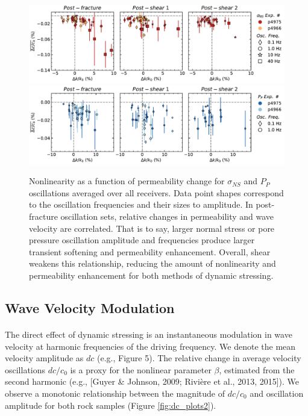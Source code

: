 \documentclass[letterpaper,10pt]{article}
\begin{document}
	
	\begin{figure}[ht]
		\centering
		\includegraphics[width=1\columnwidth]{avgDelc_All_ampsNS}
		\includegraphics[width=1\columnwidth]{avgDelc_All_ampsPP}
		\caption{Nonlinearity as a function of permeability change for $ \sigma_{NS} $ and $ P_P $ oscillations averaged over all receivers. Data point shapes correspond to the oscillation frequencies and their sizes to amplitude. In post-fracture oscillation sets, relative changes in permeability and wave velocity are correlated. That is to say, larger normal stress or pore pressure oscillation amplitude and frequencies produce larger transient softening and permeability enhancement. Overall, shear weakens this relationship, reducing the amount of nonlinearity and permeability enhancement for both methods of dynamic stressing. }
		\label{fig:delc_plots2}
	\end{figure}
	
	\clearpage
	
	\subsection{Wave Velocity Modulation}
	\paragraph{}
	The direct effect of dynamic stressing is an instantaneous modulation in wave velocity at harmonic frequencies of the driving frequency. We denote the mean velocity amplitude as $ dc $ (e.g., Figure 5). The relative change in average velocity oscillations $ dc/c_0 $ is a proxy for the nonlinear parameter $ \beta $, estimated from the second harmonic (e.g., [Guyer \& Johnson, 2009; Rivi\`ere et al., 2013, 2015]). We observe a monotonic relationship between the magnitude of $ dc/c_0 $ and oscillation amplitude for both rock samples (Figure \ref{fig:dc_plots2}).
	
\end{document}
